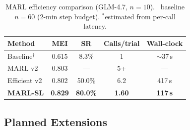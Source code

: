 \documentclass{article}
\begin{document}
\begin{table}[h]
\centering\small
\caption{MARL efficiency comparison (GLM-4.7, $n{=}10$). \dag~baseline $n{=}60$ (2-min step budget). $^*$estimated from per-call latency.}
\label{tab:marl_efficiency}
\begin{tabular}{lcccc}
\toprule
Method & MEI & SR & Calls/trial & Wall-clock \\
\midrule
Baseline$^\dag$  & 0.615 & 8.3\%  & 1    & ${\sim}$37\,s \\
MARL v2          & 0.803 & —      & 5+   & —             \\
Efficient v2     & 0.802 & 50.0\% & 6.2  & 417\,s        \\
\textbf{MARL-SL} & \textbf{0.829} & \textbf{80.0\%} & \textbf{1.60} & \textbf{117\,s} \\
\bottomrule
\end{tabular}
\end{table}

\subsection{Planned Extensions}
\end{document}
